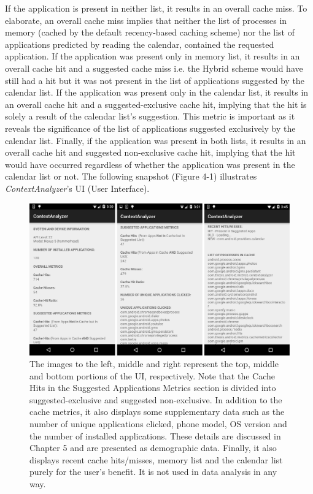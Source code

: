 \documentclass[12pt]{uthesis-v12}  %
\begin{document}
		If the application is present in neither list, it results in an overall cache miss. To elaborate, an overall cache miss implies that neither the list of processes in memory (cached by the default recency-based caching scheme) nor the list of applications predicted by reading the calendar, contained the requested application. If the application was present only in memory list, it results in an overall cache hit and a suggested cache miss i.e. the Hybrid scheme would have still had a hit but it was not present in the list of applications suggested by the calendar list. If the application was present only in the calendar list, it results in an overall cache hit and a suggested-exclusive cache hit, implying that the hit is solely a result of the calendar list's suggestion. This metric is important as it reveals the significance of the list of applications suggested exclusively by the calendar list. Finally, if the application was present in both lists, it results in an overall cache hit and suggested non-exclusive cache hit, implying that the hit would have occurred regardless of whether the application was present in the calendar list or not. The following snapshot (Figure 4-1) illustrates {\em ContextAnalyzer}'s UI (User Interface).  
		
		\begin{figure}[h]
			\centering
			\includegraphics[width = 130mm]{images/contextAnalyzerUI.png}
			\caption[Context Analyzer UI]{The images to the left, middle and right represent the top, middle and bottom portions of the UI, respectively. Note that the Cache Hits in the Suggested Applications Metrics section is divided into suggested-exclusive and suggested non-exclusive. In addition to the cache metrics, it also displays some supplementary data such as the number of unique applications clicked, phone model, OS version and the number of installed applications. These details are discussed in Chapter 5 and are presented as demographic data. Finally, it also displays recent cache hits/misses, memory list and the calendar list purely for the user's benefit. It is not used in data analysis in any way.}
		\end{figure}
		
\end{document}
